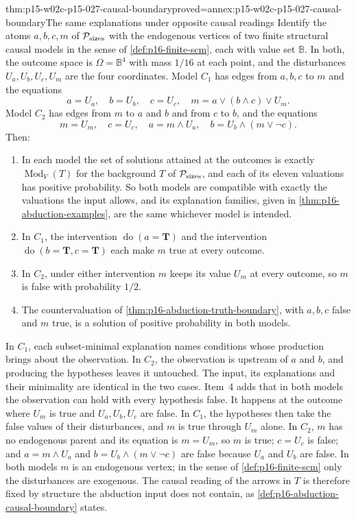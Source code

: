\begin{hbtheorem}{thm:p15-w02c-p15-027-causal-boundary}{proved=annex:p15-w02c-p15-027-causal-boundary}{The same explanations under opposite causal readings}
Identify the atoms \(a,b,c,m\) of \(\mathcal P_{\rm sizes}\) with the
endogenous vertices of two finite structural causal models in the sense
of \cref{def:p16-finite-scm}, each with value set \(\mathbb{B}\).
In both, the outcome space is \(\Omega=\mathbb{B}^4\) with mass
\(1/16\) at each point, and the disturbances \(U_a,U_b,U_c,U_m\) are
the four coordinates. Model \(C_1\) has edges from \(a,b,c\) to \(m\)
and the equations
\[
 a=U_a,\quad b=U_b,\quad c=U_c,\quad m=a\lor(b\land c)\lor U_m.
\]
Model \(C_2\) has edges from \(m\) to \(a\) and \(b\) and from \(c\)
to \(b\), and the equations
\[
 m=U_m,\quad c=U_c,\quad a=m\land U_a,\quad b=U_b\land(m\lor\neg c).
\]
Then:
\begin{enumerate}
\item In each model the set of solutions attained at the outcomes is
      exactly \(\operatorname{Mod}_V(T)\) for the background \(T\) of
      \(\mathcal P_{\rm sizes}\), and each of its eleven valuations has
      positive probability. So both models are compatible with exactly the
      valuations the input allows, and its explanation families, given in
      \cref{thm:p16-abduction-examples}, are the same whichever model is
      intended.
\item In \(C_1\), the intervention \(\operatorname{do}(a=\mathbf T)\)
      and the intervention \(\operatorname{do}(b=\mathbf T,c=\mathbf T)\)
      each make \(m\) true at every outcome.
\item In \(C_2\), under either intervention \(m\) keeps its value
      \(U_m\) at every outcome, so \(m\) is false with probability
      \(1/2\).
\item The countervaluation of \cref{thm:p16-abduction-truth-boundary},
      with \(a,b,c\) false and \(m\) true, is a solution of positive
      probability in both models.
\end{enumerate}
\end{hbtheorem}

In \(C_1\), each subset-minimal explanation names conditions whose
production brings about the observation. In \(C_2\), the observation is
upstream of \(a\) and \(b\), and producing the hypotheses leaves it
untouched. The input, its explanations and their minimality are identical
in the two cases. Item~4 adds that in both models the observation can hold
with every hypothesis false. It happens at the outcome where \(U_m\) is
true and \(U_a,U_b,U_c\) are false. In \(C_1\), the hypotheses then take
the false values of their disturbances, and \(m\) is true through \(U_m\)
alone. In \(C_2\), \(m\) has no endogenous parent and its equation is
\(m=U_m\), so \(m\) is true; \(c=U_c\) is false; and \(a=m\land U_a\) and
\(b=U_b\land(m\lor\neg c)\) are false because \(U_a\) and \(U_b\) are
false. In both models \(m\) is an endogenous vertex; in the sense of
\cref{def:p16-finite-scm} only the disturbances are exogenous. The causal reading of the arrows in
\(T\) is therefore fixed by structure the abduction input does not
contain, as \cref{def:p16-abduction-causal-boundary} states.
